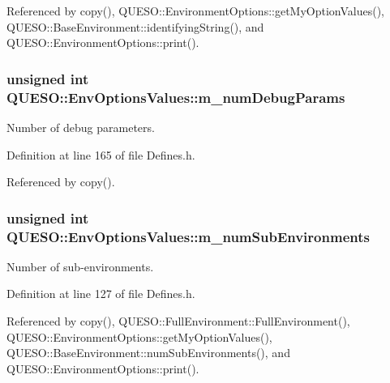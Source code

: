 Referenced by copy(), Q\-U\-E\-S\-O\-::\-Environment\-Options\-::get\-My\-Option\-Values(), Q\-U\-E\-S\-O\-::\-Base\-Environment\-::identifying\-String(), and Q\-U\-E\-S\-O\-::\-Environment\-Options\-::print().

\hypertarget{class_q_u_e_s_o_1_1_env_options_values_ab03e99e270e681196428683a3ad0de63}{
\subsubsection[{m\-\_\-num\-Debug\-Params}]{\setlength{\rightskip}{0pt plus 5cm}unsigned int Q\-U\-E\-S\-O\-::\-Env\-Options\-Values\-::m\-\_\-num\-Debug\-Params}}\label{class_q_u_e_s_o_1_1_env_options_values_ab03e99e270e681196428683a3ad0de63}


Number of debug parameters. 



Definition at line 165 of file Defines.\-h.



Referenced by copy().

\hypertarget{class_q_u_e_s_o_1_1_env_options_values_a0a53bbc1544a519eb50faddcfae0cedd}{
\subsubsection[{m\-\_\-num\-Sub\-Environments}]{\setlength{\rightskip}{0pt plus 5cm}unsigned int Q\-U\-E\-S\-O\-::\-Env\-Options\-Values\-::m\-\_\-num\-Sub\-Environments}}\label{class_q_u_e_s_o_1_1_env_options_values_a0a53bbc1544a519eb50faddcfae0cedd}


Number of sub-\/environments. 



Definition at line 127 of file Defines.\-h.



Referenced by copy(), Q\-U\-E\-S\-O\-::\-Full\-Environment\-::\-Full\-Environment(), Q\-U\-E\-S\-O\-::\-Environment\-Options\-::get\-My\-Option\-Values(), Q\-U\-E\-S\-O\-::\-Base\-Environment\-::num\-Sub\-Environments(), and Q\-U\-E\-S\-O\-::\-Environment\-Options\-::print().

